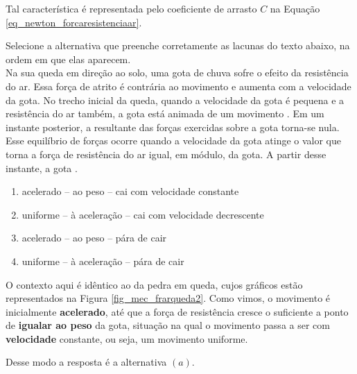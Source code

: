 Tal característica é representada pelo coeficiente de arrasto $C$ na Equação \eqref{eq_newton_forcaresistenciaar}. 


\vspace{0.3cm}


\begin{exemplo}\label{exemplo_newton_frarex01}

Selecione a alternativa que preenche corretamente as lacunas do texto abaixo, 
na ordem em que elas aparecem. \\

Na sua queda em direção ao solo, uma gota de chuva sofre o efeito da resistência do ar. 
Essa força de atrito é contrária ao movimento e aumenta com a velocidade da gota. 
No trecho inicial da queda, quando a velocidade da gota é pequena e a resistência 
do ar também, a gota está animada de um movimento \underline{\hspace{1cm}}. 
Em um instante posterior, a resultante das forças exercidas sobre a gota torna-se nula. 
Esse equilíbrio de forças ocorre quando a velocidade da gota atinge o valor que torna 
a força de resistência do ar igual, em módulo, \underline{\hspace{2cm}} da gota. 
A partir desse instante, a gota \underline{\hspace{2cm}}.

\begin{enumerate}
\item [a)] acelerado – ao peso – cai com velocidade constante
\item [b)] uniforme – à aceleração – cai com velocidade decrescente
\item [c)] acelerado – ao peso – pára de cair
\item [d)] uniforme – à aceleração – pára de cair
\end{enumerate}


\resolucao

O contexto aqui é idêntico ao da pedra em queda, cujos gráficos estão representados na Figura \ref{fig_mec_frarqueda2}. Como vimos, o movimento é inicialmente \textbf{acelerado}, até que a força de resistência cresce o suficiente a ponto de \textbf{igualar ao peso} da gota, situação na qual o movimento passa a ser com \textbf{velocidade} constante, ou seja, um movimento uniforme.

Desse modo a resposta é a alternativa $(a).$

\end{exemplo}


